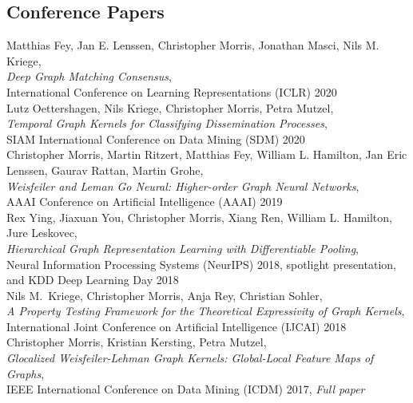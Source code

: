 \documentclass[11pt, a4paper]{scrartcl}
\newcommand{\years}[1]{\marginnote {\textbf{#1}}}
\begin{document}
\subsection*{Conference Papers}

\years{2020} Matthias Fey, Jan E. Lenssen, Christopher Morris, Jonathan Masci, Nils M. Kriege,  \\
\emph{Deep Graph Matching Consensus},\\
International Conference on Learning Representations (ICLR) 2020\\

Lutz Oettershagen, Nils Kriege, Christopher Morris, Petra Mutzel,  \\
\emph{Temporal Graph Kernels for Classifying Dissemination Processes},\\
SIAM International Conference on Data Mining (SDM) 2020\\


\years{2019}Christopher Morris, Martin Ritzert, Matthias Fey, William L. Hamilton, Jan Eric Lenssen, Gaurav Rattan, Martin Grohe,  \\
\emph{Weisfeiler and Leman Go Neural: Higher-order Graph Neural Networks},\\
AAAI Conference on Artificial Intelligence (AAAI) 2019 \\

\years{2018} Rex Ying, Jiaxuan You, Christopher Morris, Xiang Ren, William L. Hamilton, Jure Leskovec, \\
\emph{Hierarchical Graph Representation Learning with Differentiable Pooling},\\
 Neural Information Processing Systems (NeurIPS) 2018, spotlight presentation, and KDD Deep Learning Day 2018 \\

Nils M.~Kriege, Christopher Morris, Anja Rey, Christian Sohler,\\
\emph{A Property Testing Framework for the Theoretical Expressivity of Graph Kernels},\\
International Joint Conference on Artificial Intelligence (IJCAI) 2018\\

\years{2017} Christopher Morris, Kristian Kersting, Petra Mutzel,\\
\emph{Glocalized Weisfeiler-Lehman Graph Kernels: Global-Local Feature Maps of Graphs},\\
IEEE International Conference on Data Mining (ICDM) 2017, \emph{Full paper}\\
\end{document}

